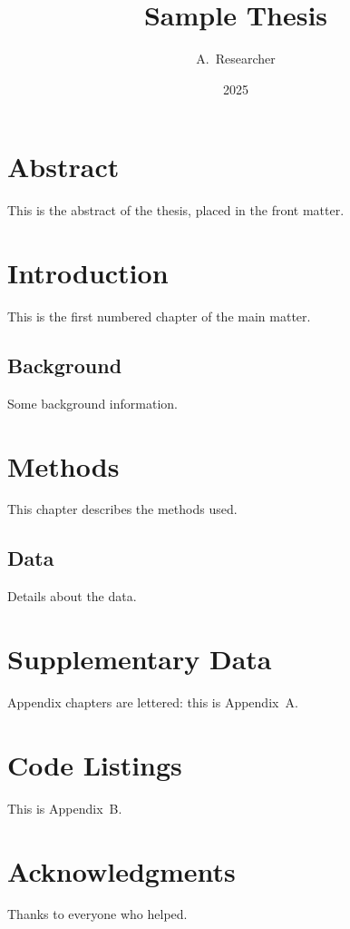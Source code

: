 \documentclass[12pt]{book}
\begin{document}
\frontmatter
\title{Sample Thesis}
\author{A.\ Researcher}
\date{2025}
\maketitle

\chapter*{Abstract}
This is the abstract of the thesis, placed in the front matter.

\tableofcontents

\mainmatter
\chapter{Introduction}
This is the first numbered chapter of the main matter.

\section{Background}
Some background information.

\chapter{Methods}
This chapter describes the methods used.

\section{Data}
Details about the data.

\appendix
\chapter{Supplementary Data}
Appendix chapters are lettered: this is Appendix~A.

\chapter{Code Listings}
This is Appendix~B.

\backmatter
\chapter*{Acknowledgments}
Thanks to everyone who helped.
\end{document}
